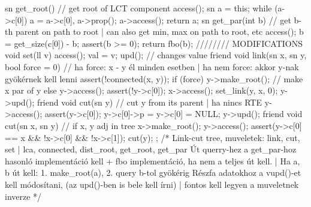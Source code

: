 {	sn get_root() { // get root of LCT component
		access(); sn a = this;
		while (a->c[0]) a = a->c[0], a->prop();
		a->access();
		return a;
	}
	sn get_par(int b) {  // get b-th parent on path to root | can also get min, max on path to root, etc
		access(); b = get_size(c[0]) - b;
		assert(b >= 0);
		return fbo(b);
	} 
	//////// MODIFICATIONS
	void set(ll v) { access(); val = v; upd(); } // changes value
	friend void link(sn x, sn y, bool force = 0) { // ha force: x - y él minden esetben | ha nem force: akkor y-nak gyökérnek kell lenni
		assert(!connected(x, y));
		if (force) y->make_root();  // make x par of y
		else { y->access(); assert(!y->c[0]); }
		x->access(); set_link(y, x, 0); y->upd();
	}
	friend void cut(sn y) {  // cut y from its parent | ha nincs RTE
		y->access();
		assert(y->c[0]);
		y->c[0]->p = y->c[0] = NULL;
		y->upd();
	}
	friend void cut(sn x, sn y) {  // if x, y adj in tree
		x->make_root(); y->access();
		assert(y->c[0] == x && !x->c[0] && !x->c[1]);
		cut(y);
	}
};
/*
Link-cut tree, muveletek: link, cut, set | lca, connected, dist_root, get_root, get_par
Út querry-hez a get_par-hoz hasonló implementáció kell + fbo implementáció, ha nem a teljes út kell. | Ha a, b út kell: 1. make_root(a), 2. query b-tol gyökérig
Részfa adatokhoz a vupd()-et kell módosítani, (az upd()-ben is bele kell írni) | fontos kell legyen a muveletnek inverze 
*/